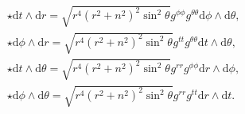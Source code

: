 \documentclass[10pt, a4paper]{article}
\begin{document}
{\begin{enumerate}
\begin{align*}
    &\star \text{d}t\wedge \text{d}r = \sqrt{r^4 (r^2 + n^2)^2 \sin^2 \theta }g^{\phi\phi}g^{\theta\theta}\text{d}\phi \wedge \text{d}\theta,\\
    &\star \text{d}\phi \wedge \text{d}r = \sqrt{r^4 (r^2 + n^2)^2 \sin^2 \theta }g^{tt}g^{\theta\theta}\text{d}t \wedge \text{d}\theta,\\
    &\star \text{d}t \wedge \text{d}\theta = \sqrt{r^4 (r^2 + n^2)^2 \sin^2 \theta }g^{rr}g^{\phi\phi}\text{d}r \wedge \text{d}\phi,\\
    &\star \text{d}\phi \wedge \text{d}\theta = \sqrt{r^4 (r^2 + n^2)^2 \sin^2 \theta }g^{rr}g^{tt}\text{d}r \wedge \text{d}t.
  \end{align*}
\end{enumerate}



}

\makereferences


\end{document}
